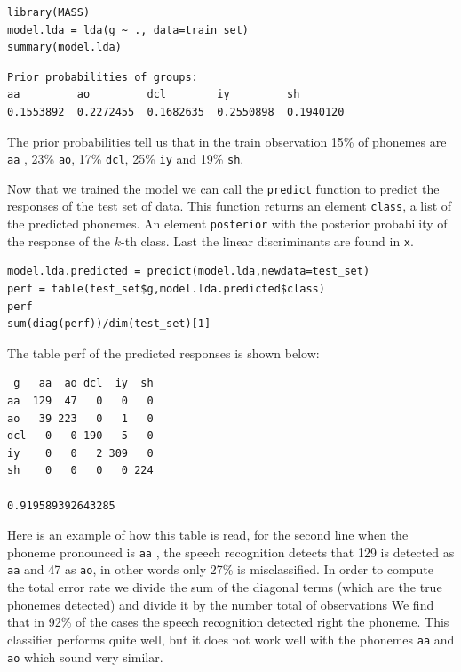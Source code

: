 \documentclass[]{report}
\begin{document}
\begin{lstlisting}
library(MASS)
model.lda = lda(g ~ ., data=train_set)
summary(model.lda)
\end{lstlisting}

\begin{verbatim}
Prior probabilities of groups:
aa         ao         dcl        iy         sh 
0.1553892  0.2272455  0.1682635  0.2550898  0.1940120 
\end{verbatim}

The prior probabilities tell us that in the train observation 15\% of phonemes are \texttt{aa} , 23\% \texttt{ao}, 17\% \texttt{dcl}, 25\% \texttt{iy} and 19\% \texttt{sh}.

Now that we trained the model we can call the \texttt{predict} function to predict the responses of the test set of data. This function returns an element \texttt{class}, a list of the predicted phonemes. An element \texttt{posterior} with the posterior probability of the response of the $k$-th class.  Last the linear discriminants are found in \texttt{x}.

\begin{lstlisting}
model.lda.predicted = predict(model.lda,newdata=test_set)
perf = table(test_set$g,model.lda.predicted$class)
perf
sum(diag(perf))/dim(test_set)[1]
\end{lstlisting}

The table perf of the predicted responses is shown below:
\begin{center}
\begin{verbatim}
 g 	 aa  ao dcl  iy  sh
aa  129  47   0   0   0
ao   39 223   0   1   0
dcl   0   0 190   5   0
iy    0   0   2 309   0
sh    0   0   0   0 224

0.919589392643285
\end{verbatim}
\end{center}

Here is an example of how this table is read, for the second line
when the phoneme pronounced is \texttt{aa} , the speech recognition detects that 129 is detected as \texttt{aa} and 47 as \texttt{ao}, in other words only 27\% is misclassified.
In order to compute the total error rate we divide the sum of the diagonal terms (which are the true phonemes detected) and divide it by the number total of observations We find that in 92\% of the cases the speech recognition detected right the phoneme. This classifier performs quite well, but it does not work well with the phonemes \texttt{aa} and \texttt{ao} which sound very similar.
\end{document}

